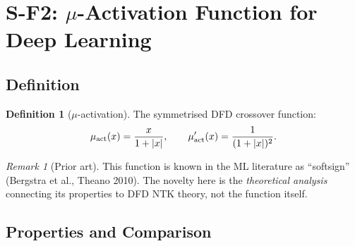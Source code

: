 \documentclass[11pt]{article}
\theoremstyle{definition}
\newtheorem{definition}[theorem]{Definition}
\theoremstyle{remark}
\newtheorem{remark}[theorem]{Remark}
\begin{document}
\section{S-F2: $\mu$-Activation Function for Deep Learning}
\label{sec:mu-activation}

\subsection{Definition}

\begin{definition}[$\mu$-activation]
The symmetrised DFD crossover function:
\begin{equation}
  \mu_{\rm act}(x) = \frac{x}{1 + |x|},
  \qquad
  \mu_{\rm act}'(x) = \frac{1}{(1 + |x|)^2}.
  \label{eq:mu-act}
\end{equation}
\end{definition}

\begin{remark}[Prior art]
This function is known in the ML literature as ``softsign'' (Bergstra
et al., Theano 2010). The novelty here is the \emph{theoretical analysis}
connecting its properties to DFD NTK theory, not the function itself.
\end{remark}

\subsection{Properties and Comparison}
\end{document}
